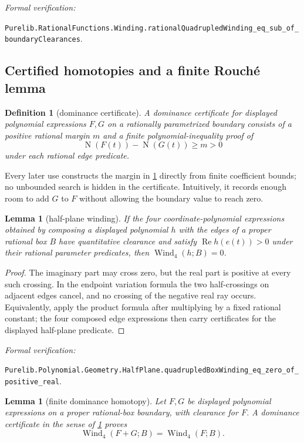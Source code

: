 \documentclass[11pt]{article}
\newtheorem{lemma}[theorem]{Lemma}
\newtheorem{definition}[theorem]{Definition}
\newcommand{\Norm}[1]{\operatorname{N}\!\left(#1\right)}
\newcommand{\Ree}{\operatorname{Re}}
\newcommand{\Wind}{\operatorname{Wind}}
\newcommand{\leanref}[1]{\par\smallskip\noindent
  \emph{Formal verification:}\par\nobreak
  {\raggedright\nolinkurl{#1}.\par}}
\begin{document}
\leanref{Purelib.RationalFunctions.Winding.rationalQuadrupledWinding_eq_sub_of_boundaryClearances}

\subsection{Certified homotopies and a finite Rouché lemma}

\begin{definition}[dominance certificate]
\label{def:dominance-certificate}
A \emph{dominance certificate} for displayed polynomial expressions $F,G$
on a rationally parametrized boundary consists of a positive rational margin
$m$ and a finite polynomial-inequality proof of
\[
        \Norm{F(t)}-\Norm{G(t)}\ge m>0
\]
under each rational edge predicate.
\end{definition}

Every later use constructs the margin in
\cref{def:dominance-certificate} directly from finite coefficient bounds;
no unbounded search is hidden in the certificate.  Intuitively, it records
enough room to add $G$ to $F$ without allowing the boundary value to reach
zero.

\begin{lemma}[half-plane winding]
\label{lem:half-plane}
If the four coordinate-polynomial expressions obtained by composing a
displayed polynomial $h$ with the edges of a proper rational box $B$ have
quantitative clearance and satisfy $\Ree h(e(t))>0$ under their rational
parameter predicates, then $\Wind_4(h;B)=0$.
\end{lemma}

\begin{proof}
The imaginary part may cross zero, but the real part is positive at every such crossing.  In the endpoint variation formula the two half-crossings on adjacent edges cancel, and no crossing of the negative real ray occurs.  Equivalently, apply the product formula after multiplying by a fixed rational constant; the four composed edge expressions then carry certificates for the displayed half-plane predicate.
\end{proof}

\leanref{Purelib.Polynomial.Geometry.HalfPlane.quadrupledBoxWinding_eq_zero_of_positive_real}

\begin{lemma}[finite dominance homotopy]
\label{lem:dominance-homotopy}
Let $F,G$ be displayed polynomial expressions on a proper rational-box
boundary, with clearance for $F$.  A dominance certificate in the sense of
\cref{def:dominance-certificate} proves
\[
       \Wind_4(F+G;B)=\Wind_4(F;B).
\]
\end{lemma}
\end{document}

